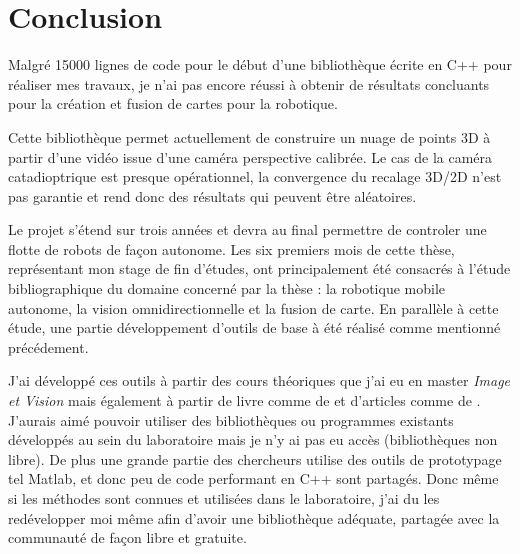 \section{Conclusion}

Malgré 15000 lignes de code pour le début d'une bibliothèque écrite en C++ pour réaliser mes travaux, je n'ai pas encore réussi à obtenir de résultats concluants pour la création et fusion de cartes pour la robotique.

Cette bibliothèque permet actuellement de construire un nuage de points 3D à partir d'une vidéo issue d'une caméra perspective calibrée.
Le cas de la caméra catadioptrique est presque opérationnel, la convergence du recalage 3D/2D n'est pas garantie et rend donc des résultats qui peuvent être aléatoires.

Le projet s'étend sur trois années et devra au final permettre de controler une flotte de robots de façon autonome.
Les six premiers mois de cette thèse, représentant mon stage de fin d'études, ont principalement été consacrés à l'étude bibliographique du domaine concerné par la thèse : la robotique mobile autonome, la vision omnidirectionnelle et la fusion de carte.
En parallèle à cette étude, une partie développement d'outils de base à été réalisé comme mentionné précédement.

J'ai développé ces outils à partir des cours théoriques que j'ai eu en master \emph{Image et Vision} mais également à partir de livre comme 
de 
\citeauthor{Hartley03Book} 
\cite{Hartley03Book} 
et d'articles comme
de 
\citeauthor{Puig08} 
\cite{Puig08}.
J'aurais aimé pouvoir utiliser des bibliothèques ou programmes existants développés au sein du laboratoire mais je n'y ai pas eu accès (bibliothèques non libre). De plus une grande partie des chercheurs utilise des outils de prototypage tel Matlab, et donc peu de code performant en C++ sont partagés. Donc même si les méthodes sont connues et utilisées dans le laboratoire, j'ai du les redévelopper moi même afin d'avoir une bibliothèque adéquate, partagée avec la communauté de façon libre et gratuite.
